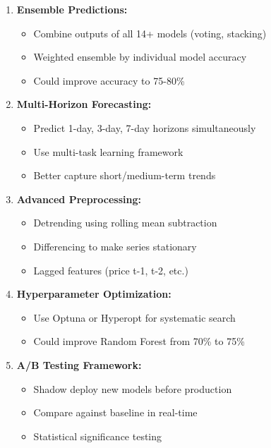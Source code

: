 \begin{enumerate}
    \item \textbf{Ensemble Predictions:}
    \begin{itemize}
        \item Combine outputs of all 14+ models (voting, stacking)
        \item Weighted ensemble by individual model accuracy
        \item Could improve accuracy to 75-80\%
    \end{itemize}
    
    \item \textbf{Multi-Horizon Forecasting:}
    \begin{itemize}
        \item Predict 1-day, 3-day, 7-day horizons simultaneously
        \item Use multi-task learning framework
        \item Better capture short/medium-term trends
    \end{itemize}
    
    \item \textbf{Advanced Preprocessing:}
    \begin{itemize}
        \item Detrending using rolling mean subtraction
        \item Differencing to make series stationary
        \item Lagged features (price t-1, t-2, etc.)
    \end{itemize}
    
    \item \textbf{Hyperparameter Optimization:}
    \begin{itemize}
        \item Use Optuna or Hyperopt for systematic search
        \item Could improve Random Forest from 70\% to 75\%
    \end{itemize}
    
    \item \textbf{A/B Testing Framework:}
    \begin{itemize}
        \item Shadow deploy new models before production
        \item Compare against baseline in real-time
        \item Statistical significance testing
    \end{itemize}
\end{enumerate}

